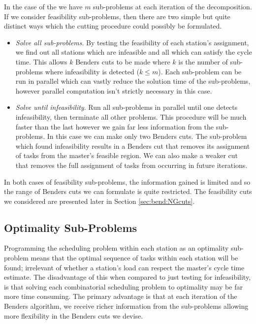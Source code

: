 In the case of the  we have $m$ sub-problems at 
each iteration of the decomposition. 
If we consider feasibility sub-problems, then there are two simple 
but quite distinct ways which the cutting procedure could 
possibly be formulated. 
\begin{itemize}
	\item \emph{Solve all sub-problems}. By testing the feasibility of each station's
	assignment, we find out all stations which are infeasible
	and all which can satisfy the cycle time.
	This allows $k$ Benders cuts to be made where $k$ is the number
	of sub-problems where infeasibility is detected ($k \leq m$).
	Each sub-problem can be run in parallel which can vastly reduce the solution
	time of the sub-problems, however parallel computation isn't strictly necessary
	in this case.
	\item \emph{Solve until infeasibility}. Run all sub-problems in parallel until
	one detects infeasibility, then terminate all other problems.
	This procedure will be much faster than the last however we gain far less information
	from the sub-problems.
	In this case we can make only two Benders cuts.
	The sub-problem which found infeasibility results in a Benders cut
	that removes its assignment of tasks from the master's feasible region.
	We can also make a weaker cut that removes the
	full assignment of tasks from occurring in future
	iterations.
\end{itemize} 

In both cases of feasibility sub-problems, the information
gained is limited and so the range of Benders cuts we can formulate
is quite restricted.
The feasibility cuts we considered are presented later in Section \ref{sec:bend:NGcuts}.

\subsection{Optimality Sub-Problems}
\label{sec:bend:SPopt}
Programming the scheduling problem within each
station as an optimality sub-problem means that
the optimal sequence of tasks within each station
will be found; irrelevant of whether a station's
load can respect the master's cycle time estimate.
The disadvantage of this when compared to
just testing for infeasibility, is that
solving each combinatorial scheduling problem
to optimality may be far more time consuming.
The primary advantage is that at each iteration
of the Benders algorithm, we receive richer information
from the sub-problems allowing more flexibility in
the Benders cuts we devise.

